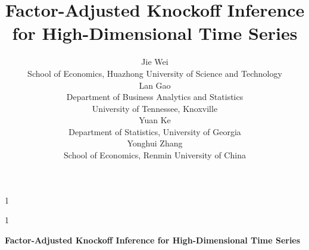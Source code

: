 ﻿\documentclass[12pt]{article}
\newcommand{\blind}{1}
\renewcommand{\baselinestretch}{1.412}
\newcommand{\0}{\mbox{\bf 0}}
\theoremstyle{plain}%
\theoremstyle{definition}
\begin{document}
%

\def\spacingset#1{\renewcommand{\baselinestretch}%
{#1}\small\normalsize} \spacingset{1}



\blind
{
  \title{\bf Factor-Adjusted Knockoff Inference for High-Dimensional Time Series}
  \author{Jie Wei%
    \\
    School of Economics, Huazhong University of Science and
Technology\\
   Lan Gao \\
    Department of Business Analytics and Statistics\\
    University of Tennessee, Knoxville \\
   Yuan Ke \\
    Department of Statistics, University of Georgia \\
    Yonghui Zhang \\
    School of Economics, Renmin University of China}
    \date{}
  \maketitle
} \fi

\blind
{
  \bigskip
  \bigskip
  \bigskip
  \begin{center}
    {\LARGE\bf %
     Factor-Adjusted Knockoff Inference for High-Dimensional Time Series 
    }
\end{center}
  \medskip
} \fi
\end{document}

